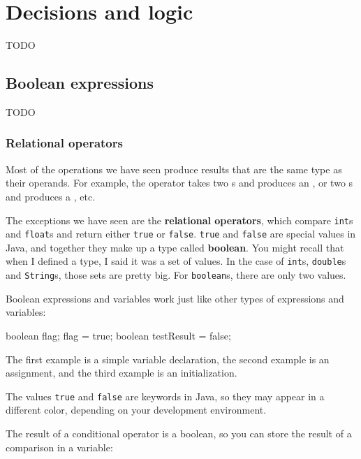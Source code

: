 \chapter{Decisions and logic}

TODO


\section{Boolean expressions}

TODO

\subsection{Relational operators}


Most of the operations we have seen produce results that are the same type as their operands.
For example, the \java{+} operator takes two s and produces an , or two s and produces a , etc.


The exceptions we have seen are the {\bf relational operators}, which compare {\tt int}s and {\tt float}s and return either {\tt true} or {\tt false}.
{\tt true} and {\tt false} are special values in Java, and together they make up a type called {\bf boolean}.
You might recall that when I defined a type, I said it was a set of values.
In the case of {\tt int}s, {\tt double}s and {\tt String}s, those sets are pretty big.
For {\tt boolean}s, there are only two values.

Boolean expressions and variables work just like other types of expressions and variables:

\begin{code}
    boolean flag;
    flag = true;
    boolean testResult = false;
\end{code}

The first example is a simple variable declaration, the second example is an assignment, and the third example is an initialization.

The values {\tt true} and {\tt false} are keywords in Java, so they may appear in a different color, depending on your development environment.


The result of a conditional operator is a boolean, so you can store the result of a comparison in a variable:

